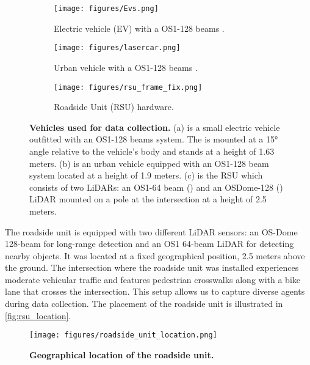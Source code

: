 \begin{figure*}
\centering
\begin{subfigure}[]{0.3\linewidth}
\centering
\texttt{[image: figures/Evs.png]}
\label{fig:ev}
\caption{\small Electric vehicle (EV) with a OS1-128 beams \lidar.}
\label{fig:evs}
\end{subfigure}
\quad
\begin{subfigure}[]{0.4\linewidth}
\centering
\texttt{[image: figures/lasercar.png]}
\label{fig:passat}
\caption{\small Urban vehicle with a OS1-128 beams \lidar.}
\end{subfigure}
\quad
\begin{subfigure}[]{0.2\linewidth}
\centering
\texttt{[image: figures/rsu\_frame\_fix.png]}
\label{fig:rsu}
\caption{\small Roadside Unit (RSU) hardware.}
\end{subfigure}
\caption{\small \textbf{Vehicles used for data collection.} (a) is a small electric vehicle outfitted with an OS1-128 beams \lidar system. The \lidar is mounted at a 15° angle relative to the vehicle's body and stands at a height of 1.63 meters. (b) is an urban vehicle equipped with an OS1-128 beam \lidar system located at a height of 1.9 meters. (c) is the RSU which consists of two LiDARs: an OS1-64 beam (\rsutop) and an OSDome-128 (\rsudome) LiDAR mounted on a pole at the intersection at a height of 2.5 meters.}
\label{fig:vehicles}

\vspace{-10px}
\end{figure*}

The roadside unit is equipped with two different LiDAR sensors: an OS-Dome 128-beam for long-range detection and an OS1 64-beam LiDAR for detecting nearby objects. It was located at a fixed geographical position, 2.5 meters above the ground.
The intersection where the roadside unit was installed experiences moderate vehicular traffic and features pedestrian crosswalks along with a bike lane that crosses the intersection. This setup allows us to capture diverse agents during data collection. The placement of the roadside unit is illustrated in \autoref{fig:rsu_location}. 


\begin{figure}[h!]
\centering
\texttt{[image: figures/roadside\_unit\_location.png]}
\caption{\small \textbf{Geographical location of the roadside unit.}}
\label{fig:rsu_location}
\vspace{-16px}
\end{figure}





